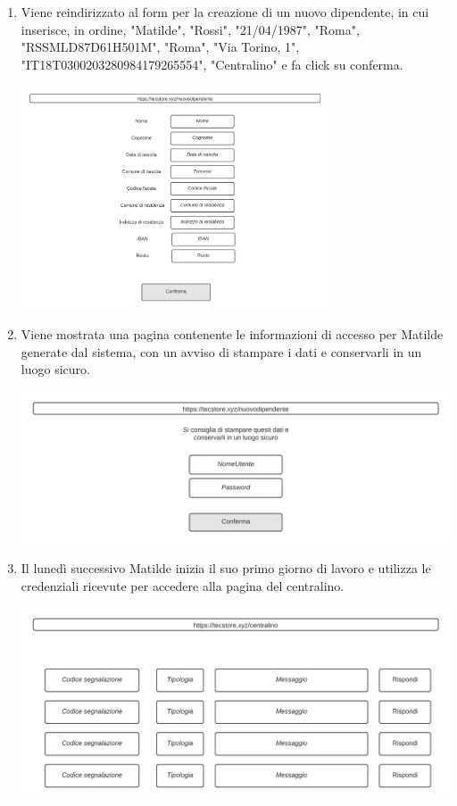 \documentclass[12pt,a4paper]{article}
\begin{document}
\begin{enumerate}
\item Viene reindirizzato al form per la creazione di un nuovo dipendente, in cui inserisce, in ordine, "Matilde", "Rossi", "21/04/1987", "Roma", "RSSMLD87D61H501M", "Roma", "Via Torino, 1", "IT18T0300203280984179265554", "Centralino" e fa click su conferma.

\begin{center}
\includegraphics[height=250px]{Mockup/nuovodipendente}
\end{center}

\newpage
\item Viene mostrata una pagina contenente le informazioni di accesso per Matilde generate dal sistema, con un avviso di stampare i dati e conservarli in un luogo sicuro.

\includegraphics[width=\textwidth]{Mockup/nuovodipendente2}

\item Il lunedì successivo Matilde inizia il suo primo giorno di lavoro e utilizza le credenziali ricevute per accedere alla pagina del centralino.

\includegraphics[width=\textwidth]{Mockup/centralino}

\end{enumerate}
\end{document}
